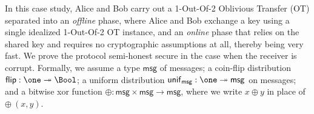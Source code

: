 \renewcommand{\msg}{\mathsf{msg}}
\newcommand{\flip}{\mathsf{flip}}
\renewcommand{\unif}{\mathsf{unif}}
\renewcommand{\id}{\mathsf{id}}
\renewcommand{\adv}{\mathsf{adv}}
\newcommand{\sen}{\mathsf{sen}}
\renewcommand{\rec}{\mathsf{rec}}
\newcommand{\ot}{\mathsf{ot}}
\renewcommand{\Msg}{\mathsf{Msg}}
\renewcommand{\Out}{\mathsf{Out}}
\newcommand{\Choice}{\mathsf{Choice}}
\newcommand{\OTMsg}{\mathsf{OTMsg}}
\newcommand{\OTOut}{\mathsf{OTOut}}
\newcommand{\OTChoice}{\mathsf{OTChoice}}
\newcommand{\Flip}{\mathsf{Flip}}
\renewcommand{\Key}{\mathsf{Key}}
\newcommand{\ChoiceEnc}{\mathsf{ChoiceEnc}}
\newcommand{\MsgEnc}{\mathsf{MsgEnc}}
\newcommand{\KeyPair}{\mathsf{KeyPair}}
\newcommand{\PrivateMsg}{\mathsf{PrivateMsg}}
\renewcommand{\LeakMsgRcvd}{\mathsf{MsgRcvd}}
\newcommand{\LeakOTMsgRcvd}{\mathsf{OTMsgRcvd}}
\newcommand{\LeakChoice}{\mathsf{Choice}}
\newcommand{\LeakOTChoice}{\mathsf{OTChoice}}
\newcommand{\LeakFlip}{\mathsf{Flip}}
\newcommand{\LeakOut}{\mathsf{Out}}
\newcommand{\LeakOTOut}{\mathsf{OTOut}}
\newcommand{\LeakChoiceEnc}{\mathsf{ChoiceEnc}}
\newcommand{\LeakMsgEnc}{\mathsf{MsgEnc}}

In this case study, Alice and Bob carry out a 1-Out-Of-2 Oblivious Transfer (OT) separated into an \emph{offline} phase, where Alice and Bob exchange a key using a single idealized 1-Out-Of-2 OT instance, and an \emph{online} phase that relies on the shared key and requires no cryptographic assumptions at all, thereby being very fast. We prove the protocol semi-honest secure in the case when the receiver is corrupt. Formally, we assume a type $\msg$ of messages; a coin-flip distribution $\flip : \one \twoheadrightarrow \Bool$; a uniform distribution $\unif_\msg : \one \twoheadrightarrow \msg$ on messages; and a bitwise xor function $\oplus : \msg \times \msg \rightarrow \msg$, where we write $x \oplus y$ in place of $\oplus \ (x,y)$.

